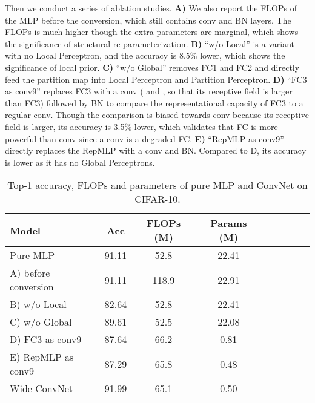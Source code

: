 \documentclass[10pt,twocolumn,letterpaper]{article}
\begin{document}
Then we conduct a series of ablation studies. \textbf{A)} We also report the FLOPs of the MLP before the conversion, which still contains conv and BN layers. The FLOPs is much higher though the extra parameters are marginal, which shows the significance of structural re-parameterization. \textbf{B)} ``w/o Local'' is a variant with no Local Perceptron, and the accuracy is 8.5\% lower, which shows the significance of local prior. \textbf{C)} ``w/o Global'' removes FC1 and FC2 and directly feed the partition map into Local Perceptron and Partition Perceptron. \textbf{D)} ``FC3 as conv9'' replaces FC3 with a conv ( and , so that its receptive field is larger than FC3) followed by BN to compare the representational capacity of FC3 to a regular conv. Though the comparison is biased towards conv because its receptive field is larger, its accuracy is 3.5\% lower, which validates that FC is more powerful than conv since a conv is a degraded FC. \textbf{E)} ``RepMLP as conv9'' directly replaces the RepMLP with a  conv and BN. Compared to D, its accuracy is lower as it has no Global Perceptrons. 

\setlength{\tabcolsep}{4pt}
\begin{table}
	\caption{Top-1 accuracy, FLOPs and parameters of pure MLP and ConvNet on CIFAR-10. }
	\label{table-puremlp}
	\vspace{-0.2in}
	\begin{center}
		\small
		\begin{tabular}{lcccccccc}
			\hline
			Model					&	Acc		&	 FLOPs (M)	&	Params (M) 	\\
			\hline
			Pure MLP				&	91.11	&	52.8		&	22.41	\\
			A) before conversion	&	91.11	&	118.9		&	22.91	\\	
			B) w/o Local			&	82.64	&	52.8		&	22.41	\\	
			C) w/o Global			&	89.61	&	52.5		&	22.08	\\
			D) FC3 as conv9			&	87.64	&	66.2		&	0.81		\\
			E) RepMLP as conv9		&	87.29	&	65.8		&	0.48		\\
			\hline			
			Wide ConvNet	&	91.99	&	65.1		&	0.50		\\
			\hline
		\end{tabular}
	\end{center}
	\vspace{-0.2in}
\end{table}
\setlength{\tabcolsep}{1.4pt}
\end{document}
